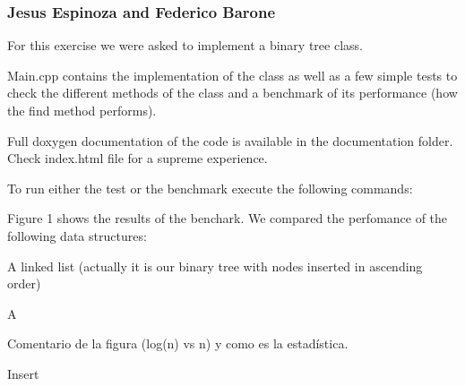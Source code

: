 \subsubsection*{Jesus Espinoza and Federico Barone}

\DoxyHorRuler


For this exercise we were asked to implement a binary tree class.

{\ttfamily Main.\+cpp} contains the implementation of the class as well as a few simple tests to check the different methods of the class and a benchmark of its performance (how the find method performs).

Full {\ttfamily doxygen} documentation of the code is available in the documentation folder. Check {\ttfamily index.\+html} file for a supreme experience.

To run either the test or the benchmark execute the following commands\+:

Figure 1 shows the results of the benchark. We compared the perfomance of the following data structures\+:


\begin{DoxyItemize}
\item A linked list (actually it is our binary tree with nodes inserted in ascending order)
\item A
\item 
\end{DoxyItemize}



Comentario de la figura (log(n) vs n) y como es la estadística.

Insert 